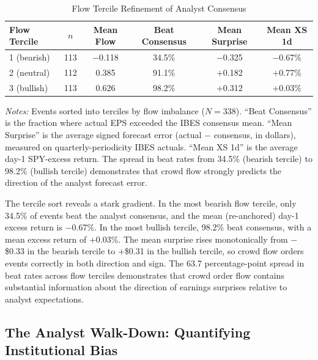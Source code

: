 \documentclass[11pt]{article}
\begin{document}
\begin{table}[htbp]
\centering
\begin{threeparttable}
\caption{Flow Tercile Refinement of Analyst Consensus}
\label{tab:refinement}
\begin{tabular}{lccccc}
\toprule
Flow Tercile & $n$ & Mean Flow & Beat Consensus & Mean Surprise & Mean XS 1d \\
\midrule
1 (bearish) & 113 & $-$0.118 & 34.5\% & $-$0.325 & $-$0.67\% \\
2 (neutral) & 112 & 0.385 & 91.1\% & $+$0.182 & $+$0.77\% \\
3 (bullish) & 113 & 0.626 & 98.2\% & $+$0.312 & $+$0.03\% \\
\bottomrule
\end{tabular}
\begin{tablenotes}
\small
\item \textit{Notes:} Events sorted into terciles by flow imbalance ($N = 338$). ``Beat Consensus'' is the fraction where actual EPS exceeded the IBES consensus mean. ``Mean Surprise'' is the average signed forecast error (actual $-$ consensus, in dollars), measured on quarterly-periodicity IBES actuals. ``Mean XS 1d'' is the average day-1 SPY-excess return. The spread in beat rates from 34.5\% (bearish tercile) to 98.2\% (bullish tercile) demonstrates that crowd flow strongly predicts the direction of the analyst forecast error.
\end{tablenotes}
\end{threeparttable}
\end{table}

The tercile sort reveals a stark gradient. In the most bearish flow tercile, only 34.5\% of events beat the analyst consensus, and the mean (re-anchored) day-1 excess return is $-$0.67\%. In the most bullish tercile, 98.2\% beat consensus, with a mean excess return of $+$0.03\%. The mean surprise rises monotonically from $-$\$0.33 in the bearish tercile to $+$\$0.31 in the bullish tercile, so crowd flow orders events correctly in both direction and sign. The 63.7 percentage-point spread in beat rates across flow terciles demonstrates that crowd order flow contains substantial information about the direction of earnings surprises relative to analyst expectations.

\subsection{The Analyst Walk-Down: Quantifying Institutional Bias}
\end{document}
